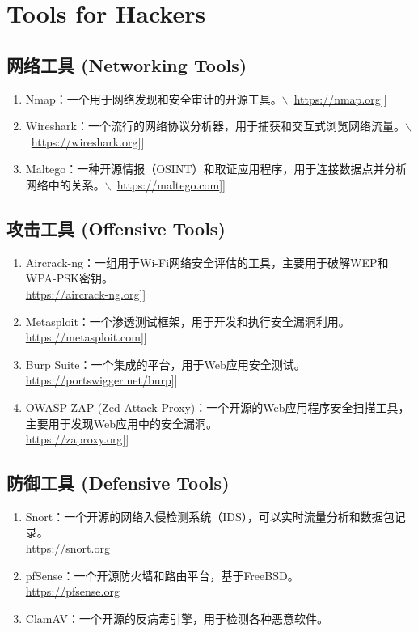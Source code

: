\documentclass[11pt]{article}
\date{\today}
\title{}
\begin{document}
\tableofcontents

\section{Tools for Hackers}
\label{sec:org5edc634}
\subsection{网络工具 (Networking Tools)}
\label{sec:org0582357}
\begin{enumerate}
\item Nmap：一个用于网络发现和安全审计的开源工具。$\backslash$\ \url{https://nmap.org}]]
\item Wireshark：一个流行的网络协议分析器，用于捕获和交互式浏览网络流量。$\backslash$\ \url{https://wireshark.org}]]
\item Maltego：一种开源情报（OSINT）和取证应用程序，用于连接数据点并分析网络中的关系。$\backslash$\ \url{https://maltego.com}]]
\end{enumerate}

\subsection{攻击工具 (Offensive Tools)}
\label{sec:org47dde9d}
\begin{enumerate}
\item Aircrack-ng：一组用于Wi-Fi网络安全评估的工具，主要用于破解WEP和WPA-PSK密钥。\\
\url{https://aircrack-ng.org}]]
\item Metasploit：一个渗透测试框架，用于开发和执行安全漏洞利用。\\
\url{https://metasploit.com}]]
\item Burp Suite：一个集成的平台，用于Web应用安全测试。 \\
\url{https://portswigger.net/burp}]]
\item OWASP ZAP (Zed Attack Proxy)：一个开源的Web应用程序安全扫描工具，主要用于发现Web应用中的安全漏洞。\\
\url{https://zaproxy.org}]]
\end{enumerate}

\subsection{防御工具 (Defensive Tools)}
\label{sec:org397d3c2}
\begin{enumerate}
\item Snort：一个开源的网络入侵检测系统（IDS），可以实时流量分析和数据包记录。\\
\url{https://snort.org}
\item pfSense：一个开源防火墙和路由平台，基于FreeBSD。\\
\url{https://pfsense.org}
\item ClamAV：一个开源的反病毒引擎，用于检测各种恶意软件。\\
\end{enumerate}
\end{document}
